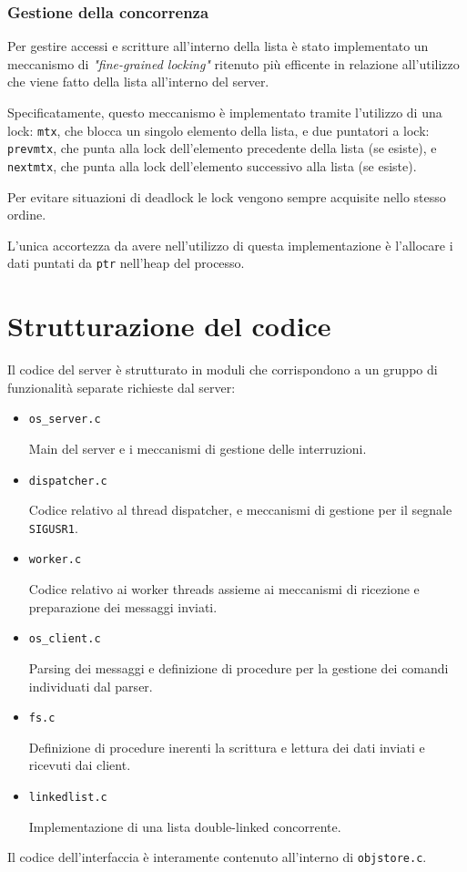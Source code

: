 \documentclass[a4paper,11pt]{article}
\begin{document}
\subsubsection*{Gestione della concorrenza}
Per gestire accessi e scritture all'interno della lista è stato implementato un meccanismo di \emph{"fine-grained locking"} ritenuto più efficente in relazione
all'utilizzo che viene fatto della lista all'interno del server.

Specificatamente, questo meccanismo è implementato tramite l'utilizzo di una lock: \texttt{mtx}, che blocca un singolo elemento della lista, e due puntatori a lock:
\texttt{prevmtx}, che punta alla lock dell'elemento precedente della lista (se esiste), e \texttt{nextmtx}, che punta alla lock dell'elemento successivo alla lista (se esiste).

Per evitare situazioni di deadlock le lock vengono sempre acquisite nello stesso ordine.

L'unica accortezza da avere nell'utilizzo di questa implementazione è l'allocare i dati puntati da \texttt{ptr} nell'heap del processo.

\section{Strutturazione del codice}
Il codice del server è strutturato in moduli che corrispondono a un gruppo di funzionalità separate richieste dal server:
\begin{itemize}
    \item \texttt{os\_server.c}
    
    Main del server e i meccanismi di gestione delle interruzioni.
    \item \texttt{dispatcher.c}
    
    Codice relativo al thread dispatcher, e meccanismi di gestione per il segnale \texttt{SIGUSR1}.
    \item \texttt{worker.c}
    
    Codice relativo ai worker threads assieme ai meccanismi di ricezione e preparazione dei messaggi inviati.

    \item \texttt{os\_client.c}
    
    Parsing dei messaggi e definizione di procedure per la gestione dei comandi individuati dal parser.
    
    \item \texttt{fs.c}
    
    Definizione di procedure inerenti la scrittura e lettura dei dati inviati e ricevuti dai client.
    
    \item \texttt{linkedlist.c}
    
    Implementazione di una lista double-linked concorrente.
\end{itemize}
\smallskip
Il codice dell'interfaccia è interamente contenuto all'interno di \texttt{objstore.c}.
\end{document}
